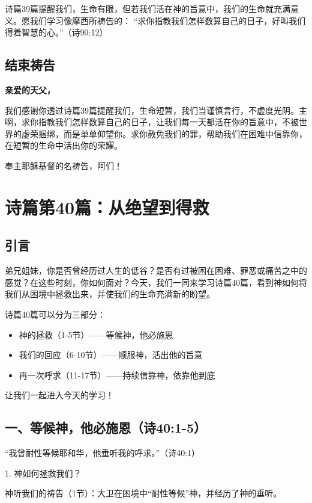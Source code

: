 \documentclass[a4paper, 12pt]{article}
\begin{document}
诗篇39篇提醒我们，生命有限，但若我们活在神的旨意中，我们的生命就充满意义。愿我们学习像摩西所祷告的：
“求你指教我们怎样数算自己的日子，好叫我们得着智慧的心。”（诗90:12）

\subsection*{结束祷告}
\textbf{亲爱的天父，}

我们感谢你透过诗篇39篇提醒我们，生命短暂，我们当谨慎言行，不虚度光阴。主啊，求你指教我们怎样数算自己的日子，让我们每一天都活在你的旨意中，不被世界的虚荣捆绑，而是单单仰望你。求你赦免我们的罪，帮助我们在困难中信靠你，在短暂的生命中活出你的荣耀。

奉主耶稣基督的名祷告，阿们！
\newpage
\section{诗篇第40篇：从绝望到得救}
\subsection*{引言}
\hspace{0.6cm}弟兄姐妹，你是否曾经历过人生的低谷？是否有过被困在困难、罪恶或痛苦之中的感觉？在这些时刻，你如何面对？今天，我们一同来学习诗篇40篇，看到神如何将我们从困境中拯救出来，并使我们的生命充满新的盼望。

诗篇40篇可以分为三部分：
\begin{itemize}
    \item 神的拯救（1-5节）——等候神，他必施恩

    \item 我们的回应（6-10节）——顺服神，活出他的旨意

    \item 再一次呼求（11-17节）——持续信靠神，依靠他到底

\end{itemize}

让我们一起进入今天的学习！

\subsection*{一、等候神，他必施恩（诗40:1-5）}
“我曾耐性等候耶和华，他垂听我的呼求。”（诗40:1）

1. 神如何拯救我们？

神听我们的祷告（1节）：大卫在困境中“耐性等候”神，并经历了神的垂听。
\end{document}
